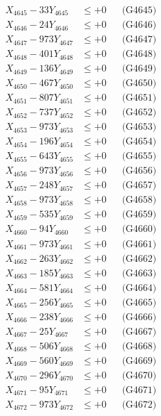 \documentclass[a4paper,10pt]{article}
\begin{document}
{\begin{align}
X_{4645} - 33Y_{4645} &\leq +0 && \text{(G4645)} \\
X_{4646} - 24Y_{4646} &\leq +0 && \text{(G4646)} \\
X_{4647} - 973Y_{4647} &\leq +0 && \text{(G4647)} \\
X_{4648} - 401Y_{4648} &\leq +0 && \text{(G4648)} \\
X_{4649} - 136Y_{4649} &\leq +0 && \text{(G4649)} \\
X_{4650} - 467Y_{4650} &\leq +0 && \text{(G4650)} \\
\allowbreak
X_{4651} - 807Y_{4651} &\leq +0 && \text{(G4651)} \\
X_{4652} - 737Y_{4652} &\leq +0 && \text{(G4652)} \\
X_{4653} - 973Y_{4653} &\leq +0 && \text{(G4653)} \\
X_{4654} - 196Y_{4654} &\leq +0 && \text{(G4654)} \\
X_{4655} - 643Y_{4655} &\leq +0 && \text{(G4655)} \\
X_{4656} - 973Y_{4656} &\leq +0 && \text{(G4656)} \\
X_{4657} - 248Y_{4657} &\leq +0 && \text{(G4657)} \\
X_{4658} - 973Y_{4658} &\leq +0 && \text{(G4658)} \\
X_{4659} - 535Y_{4659} &\leq +0 && \text{(G4659)} \\
X_{4660} - 94Y_{4660} &\leq +0 && \text{(G4660)} \\
\allowbreak
X_{4661} - 973Y_{4661} &\leq +0 && \text{(G4661)} \\
X_{4662} - 263Y_{4662} &\leq +0 && \text{(G4662)} \\
X_{4663} - 185Y_{4663} &\leq +0 && \text{(G4663)} \\
X_{4664} - 581Y_{4664} &\leq +0 && \text{(G4664)} \\
X_{4665} - 256Y_{4665} &\leq +0 && \text{(G4665)} \\
X_{4666} - 238Y_{4666} &\leq +0 && \text{(G4666)} \\
X_{4667} - 25Y_{4667} &\leq +0 && \text{(G4667)} \\
X_{4668} - 506Y_{4668} &\leq +0 && \text{(G4668)} \\
X_{4669} - 560Y_{4669} &\leq +0 && \text{(G4669)} \\
X_{4670} - 296Y_{4670} &\leq +0 && \text{(G4670)} \\
\allowbreak
X_{4671} - 95Y_{4671} &\leq +0 && \text{(G4671)} \\
X_{4672} - 973Y_{4672} &\leq +0 && \text{(G4672)} \\

\end{align}}
\end{document}
